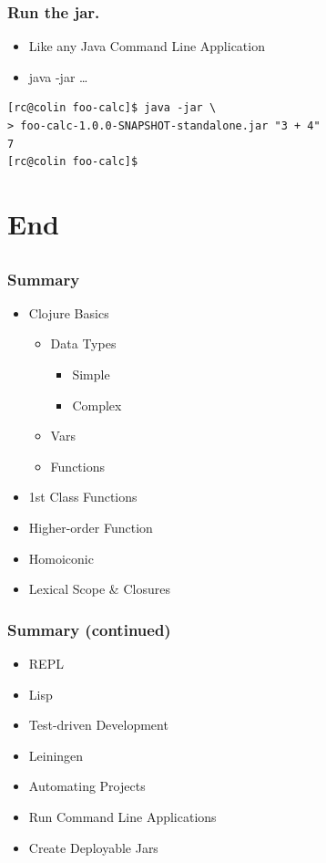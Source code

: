 \documentclass{beamer}
\begin{document}
\begin{frame}[fragile]
\frametitle{Run the jar.}
\begin{itemize}
\item Like any Java Command Line Application
\item java -jar \ldots
\end{itemize}
\begin{lstlisting}[basicstyle=\scriptsize]
[rc@colin foo-calc]$ java -jar \ 
> foo-calc-1.0.0-SNAPSHOT-standalone.jar "3 + 4" 
7
[rc@colin foo-calc]$  
\end{lstlisting}
\end{frame}

  \section{End}
  \subsection{}
  
  \begin{frame}[c]
    \frametitle{Summary}
    \begin{itemize}
        \item Clojure Basics
            \begin{itemize}
                \item Data Types
                    \begin{itemize}
                        \item Simple
                        \item Complex
                    \end{itemize}
                \item Vars
                \item Functions
            \end{itemize}
        \item 1st Class Functions
        \item Higher-order Function
        \item Homoiconic
        \item Lexical Scope \& Closures
    \end{itemize}
  \end{frame}

  \begin{frame}[c]
    \frametitle{Summary (continued)}
    \begin{itemize}
        \item REPL
        \item Lisp
        \item Test-driven Development
        \item Leiningen
        \item Automating Projects
        \item Run Command Line Applications
        \item Create Deployable Jars
    \end{itemize}
  \end{frame}
\end{document}
